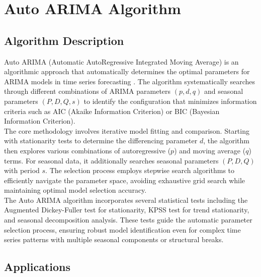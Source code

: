 %
%
%


%
%

\chapter{Auto ARIMA Algorithm}
\label{ch:autoarima}

\section{Algorithm Description}
\label{sec:algorithm_description}

Auto ARIMA (Automatic AutoRegressive Integrated Moving Average) is an algorithmic approach that automatically determines the optimal parameters for ARIMA models in time series forecasting \cite{HyndmanKhandakar:2008}. The algorithm systematically searches through different combinations of ARIMA parameters $(p, d, q)$ and seasonal parameters $(P, D, Q, s)$ to identify the configuration that minimizes information criteria such as AIC (Akaike Information Criterion) or BIC (Bayesian Information Criterion).\\

The core methodology involves iterative model fitting and comparison. Starting with stationarity tests to determine the differencing parameter $d$, the algorithm then explores various combinations of autoregressive ($p$) and moving average ($q$) terms. For seasonal data, it additionally searches seasonal parameters $(P, D, Q)$ with period $s$. The selection process employs stepwise search algorithms to efficiently navigate the parameter space, avoiding exhaustive grid search while maintaining optimal model selection accuracy.\\

The Auto ARIMA algorithm incorporates several statistical tests including the Augmented Dickey-Fuller test for stationarity, KPSS test for trend stationarity, and seasonal decomposition analysis. These tests guide the automatic parameter selection process, ensuring robust model identification even for complex time series patterns with multiple seasonal components or structural breaks.

\section{Applications}
\label{sec:applications}

